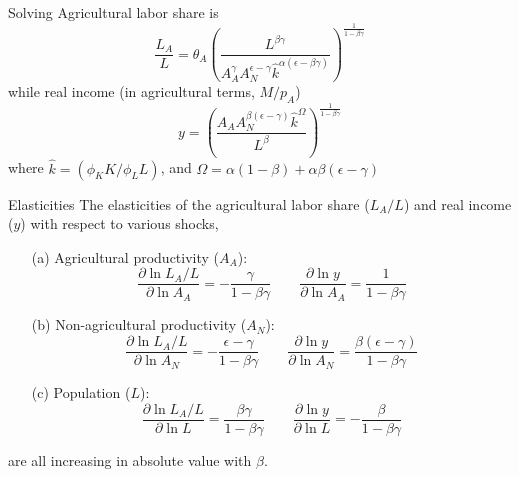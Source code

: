 \documentclass[10pt, xcolor=dvipsnames]{beamer}
\begin{document}
\begin{frame}{Solving}
Agricultural labor share is
\begin{equation}
  \frac{L_A}{L} = \theta_A \left(\frac{L^{\beta\gamma}}{A_A^{\gamma} A_N^{\epsilon - \gamma} \hat{k}^{\alpha(\epsilon - \beta\gamma)}}\right)^{\frac{1}{1-\beta\gamma}} \label{EQ_LAL}
\end{equation}
while real income (in agricultural terms, $M/p_A$)
\begin{equation}
  y = \left(\frac{A_A A_N^{\beta(\epsilon-\gamma)}\hat{k}^{\Omega}}{L^{\beta}} \right)^{\frac{1}{1-\beta\gamma}} \label{EQ_y}
\end{equation}
where $\hat{k} = (\phi_K K/\phi_L L)$, and $\Omega = \alpha(1-\beta) + \alpha\beta(\epsilon-\gamma)$
\end{frame}

\begin{frame}{Elasticities}
The elasticities of the agricultural labor share ($L_A/L$) and real income ($y$) with respect to various shocks,
\begin{enumerate}
  \item[(a)] Agricultural productivity ($A_A$): 
\begin{equation}
  \frac{\partial \ln L_A/L}{\partial \ln A_A} = - \frac{\gamma}{1-\beta\gamma} \quad \quad \frac{\partial \ln y}{\partial \ln A_A} = \frac{1}{1-\beta\gamma}
\end{equation}
  \item[(b)] Non-agricultural productivity ($A_N$): 
\begin{equation}
  \frac{\partial \ln L_A/L}{\partial \ln A_N} = - \frac{\epsilon-\gamma}{1-\beta\gamma} \quad \quad \frac{\partial \ln y}{\partial \ln A_N} = \frac{\beta(\epsilon-\gamma)}{1-\beta\gamma}
\end{equation}
  \item[(c)] Population ($L$): 
\begin{equation}
  \frac{\partial \ln L_A/L}{\partial \ln L} = \frac{\beta\gamma}{1-\beta\gamma} \quad \quad \frac{\partial \ln y}{\partial \ln L} = - \frac{\beta}{1-\beta\gamma}
\end{equation}
\end{enumerate}
are all increasing in absolute value with $\beta$.
\end{frame}
\end{document}

